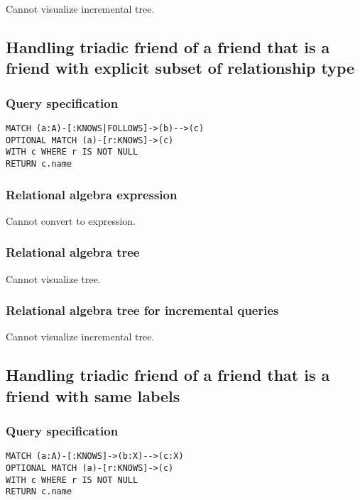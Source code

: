 Cannot visualize incremental tree.

\subsection{Handling triadic friend of a friend that is a friend with explicit subset of relationship type}

\subsubsection*{Query specification}

\begin{lstlisting}
MATCH (a:A)-[:KNOWS|FOLLOWS]->(b)-->(c)
OPTIONAL MATCH (a)-[r:KNOWS]->(c)
WITH c WHERE r IS NOT NULL
RETURN c.name
\end{lstlisting}

\subsubsection*{Relational algebra expression}

Cannot convert to expression.

\subsubsection*{Relational algebra tree}

Cannot visualize tree.

\subsubsection*{Relational algebra tree for incremental queries}

Cannot visualize incremental tree.

\subsection{Handling triadic friend of a friend that is a friend with same labels}

\subsubsection*{Query specification}

\begin{lstlisting}
MATCH (a:A)-[:KNOWS]->(b:X)-->(c:X)
OPTIONAL MATCH (a)-[r:KNOWS]->(c)
WITH c WHERE r IS NOT NULL
RETURN c.name
\end{lstlisting}

